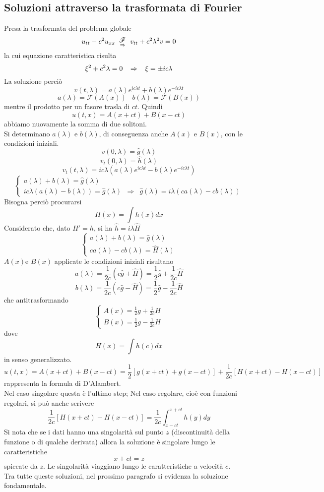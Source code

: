 \subsection{Soluzioni attraverso la trasformata di Fourier}
Presa la trasformata del problema globale
\[
	u_{tt} - c^2u_{xx}
	\substack{\displaystyle{\mathscr{F}} \\ \;\;\; \Rightarrow \;\;\;}
	v_{tt} + c^2 \lambda^2 v = 0
\]
la cui equazione caratteristica risulta
\[
	\xi^2 +c^2 \lambda=0 \;\;\; \Rightarrow \;\;\; \xi=\pm ic \lambda
\]
La soluzione perci\`o
\[
	v(t,\lambda)= a(\lambda)e^{ic\lambda t} + b(\lambda)e^{-ic\lambda t}
\]
\[
	a(\lambda)= {\mathscr{F} \left( A(x) \right)} \;\;\;
	b(\lambda)= {\mathscr{F} \left( B(x) \right)}
\]
mentre il prodotto per un fasore trasla di $ct$.
Quindi
\[
	u(t,x)= A(x+ct) + B(x-ct)
\]
abbiamo nuovamente la somma di due solitoni.\\
Si determinano $a(\lambda)$ e $b(\lambda)$, di conseguenza anche $A(x)$ e
$B(x)$, con le condizioni iniziali.
\[
	v(0,\lambda)=\hat{g}(\lambda)
\]
\[
	v_t(0,\lambda)=\hat{h}(\lambda)
\]
\[
	v_t(t,\lambda)= ic\lambda \left(
	a(\lambda)e^{ic\lambda t} - b(\lambda)e^{-ic\lambda t} \right)
\]
\[
	\left\{
	\begin{array}{lcl}
		a(\lambda)+b(\lambda)=\hat{g}(\lambda) \\
		ic\lambda (a(\lambda)-b(\lambda))= \hat{g}(\lambda)
		&\Rightarrow&
		\hat{g}(\lambda) = i\lambda (ca(\lambda) - cb(\lambda))
	\end{array}
	\right.
\]
Bisogna perci\`o procurarsi
\[
	H(x)= \int h(x)dx
\]
Considerato che, dato $H'=h$, si ha $\hat{h}=i\lambda \hat{H}$
\[
	\left\{
	\begin{array}{l}
		a(\lambda)+b(\lambda)=\hat{g}(\lambda) \\
		ca(\lambda)-cb(\lambda)= \hat{H}(\lambda)
	\end{array}
	\right.
\]
$A(x)$e $B(x)$ applicate le condizioni iniziali risultano
\[
	a(\lambda)=\frac{1}{2c}(c\hat{g}+ \hat{H})
	= \frac{1}{2}\hat{g}+ \frac{1}{2c}\hat{H}
\]
\[
	b(\lambda)=\frac{1}{2c}(c\hat{g}- \hat{H})
	= \frac{1}{2}\hat{g}- \frac{1}{2c}\hat{H}
\]
che antitrasformando
\[
	\left\{
	\begin{array}{l}
		A(x)=\frac{1}{2}g + \frac{1}{2c}H \\
		B(x)=\frac{1}{2}g - \frac{1}{2c}H
	\end{array}
	\right.
\]
dove
\[
	H(x)= \int h(c) dx
\]
in senso generalizzato.
\[
	u(t,x)= A(x +ct) + B(x-ct)=
	\frac{1}{2}[g(x+ct)+ g(x-ct)]+
	\frac{1}{2c}[H(x+ct)-H(x-ct)]
\]
rappresenta la formula di D'Alambert.\\
Nel caso singolare questa \`e l'ultimo step; Nel caso regolare, cio\`e con
funzioni regolari, si pu\`o anche scrivere
\[
	\frac{1}{2c}[H(x+ct)-H(x-ct)]=
	\frac{1}{2c}\int_{x-ct}^{x+ct} h(y)dy
\]
Si nota che se i dati hanno una singolarit\`a sul punto $z$ (discontinuit\`a
della funzione o di qualche derivata) allora la soluzione \`e singolare lungo
le caratteristiche
\[
	x \pm ct=z
\]
spiccate da $z$. Le singolarit\`a viaggiano lungo le caratteristiche a
velocit\`a $c$.\\
Tra tutte queste soluzioni, nel prossimo paragrafo si evidenza la soluzione
fondamentale.
